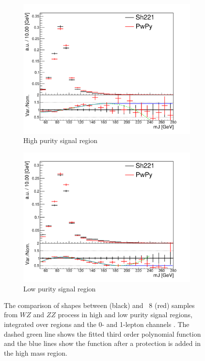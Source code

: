 \begin{figure}[!htbp]
  \centering
  \begin{subfigure}{.5\textwidth}
    \includegraphics[width=\textwidth]{chapters/6.vhbb_boosted/figs/01L_VV_2tag1pfat0jet_ptvinc_SR_noaddbjetsr_mJIncl_SysPwPy.pdf}
    \caption{High purity signal region}
    \label{fig:VV_PP8Fit_sub1}
  \end{subfigure}%
  \begin{subfigure}{.5\textwidth}
    \includegraphics[width=\textwidth]{chapters/6.vhbb_boosted/figs/01L_VV_2tag1pfat1pjet_ptvinc_SR_noaddbjetsr_mJIncl_SysPwPy.pdf}
    \caption{Low purity signal region}
    \label{fig:VV_PP8Fit_sub2}
  \end{subfigure}
  \caption{
    The comparison of \mJ shapes between \SHERP (black) and \POWPYTHIA~8 (red) samples from $WZ$ and $ZZ$ process in high and low purity signal regions, integrated over \pTV regions and the 0- and 1-lepton channels \cite{Dao:2688371}.
    The dashed green line shows the fitted third order polynomial function and the blue lines show the function after a protection is added in the high mass region.
  }
  \label{fig:VV_PP8Fit}
\end{figure}




